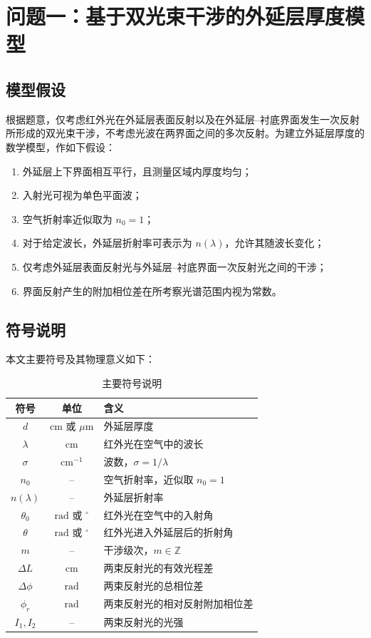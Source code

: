 \documentclass[UTF8,12pt,a4paper]{ctexart}
\begin{document}
\section{问题一：基于双光束干涉的外延层厚度模型}

\subsection{模型假设}

根据题意，仅考虑红外光在外延层表面反射以及在外延层--衬底界面发生一次反射所形成的双光束干涉，不考虑光波在两界面之间的多次反射。为建立外延层厚度的数学模型，作如下假设：

\begin{enumerate}
    \item 外延层上下界面相互平行，且测量区域内厚度均匀；
    \item 入射光可视为单色平面波；
    \item 空气折射率近似取为 $n_0=1$；
    \item 对于给定波长，外延层折射率可表示为 $n(\lambda)$，允许其随波长变化；
    \item 仅考虑外延层表面反射光与外延层--衬底界面一次反射光之间的干涉；
    \item 界面反射产生的附加相位差在所考察光谱范围内视为常数。
\end{enumerate}

\subsection{符号说明}

本文主要符号及其物理意义如下：

\begin{table}[H]
    \centering
    \caption{主要符号说明}
    \begin{tabular}{ccl}
        \toprule
        符号 & 单位 & 含义 \\
        \midrule
        $d$ & $\mathrm{cm}$ 或 $\mu\mathrm{m}$ & 外延层厚度 \\
        $\lambda$ & $\mathrm{cm}$ & 红外光在空气中的波长 \\
        $\sigma$ & $\mathrm{cm}^{-1}$ & 波数，$\sigma=1/\lambda$ \\
        $n_0$ & -- & 空气折射率，近似取 $n_0=1$ \\
        $n(\lambda)$ & -- & 外延层折射率 \\
        $\theta_0$ & $\mathrm{rad}$ 或 $^\circ$ & 红外光在空气中的入射角 \\
        $\theta$ & $\mathrm{rad}$ 或 $^\circ$ & 红外光进入外延层后的折射角 \\
        $m$ & -- & 干涉级次，$m\in\mathbb{Z}$ \\
        $\Delta L$ & $\mathrm{cm}$ & 两束反射光的有效光程差 \\
        $\Delta\phi$ & $\mathrm{rad}$ & 两束反射光的总相位差 \\
        $\phi_r$ & $\mathrm{rad}$ & 两束反射光的相对反射附加相位差 \\
        $I_1,I_2$ & -- & 两束反射光的光强 \\
        \bottomrule
    \end{tabular}
\end{table}
\end{document}
